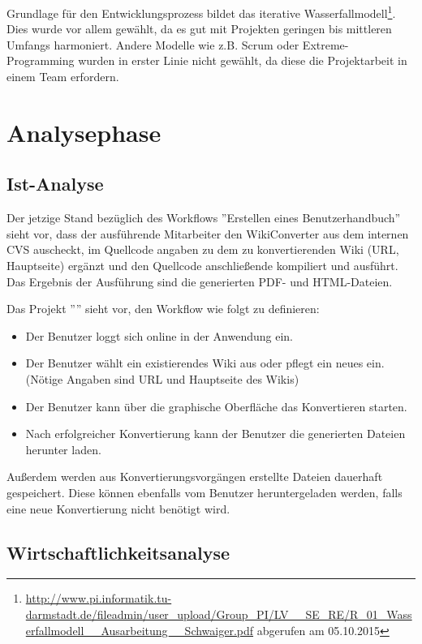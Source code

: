 \documentclass[12pt, xcolor=dvipsnames]{scrartcl}
\begin{document}
Grundlage für den Entwicklungsprozess bildet das iterative Wasserfallmodell\footnote{\url{http://www.pi.informatik.tu-darmstadt.de/fileadmin/user_upload/Group_PI/LV__SE_RE/R_01_Wasserfallmodell__Ausarbeitung__Schwaiger.pdf} abgerufen am 05.10.2015}.
Dies wurde vor allem gewählt, da es gut mit Projekten geringen bis mittleren Umfangs harmoniert. Andere Modelle wie z.B. Scrum oder Extreme-Programming wurden in erster Linie nicht gewählt, da diese die Projektarbeit in einem Team erfordern.

\section{Analysephase}

\subsection{Ist-Analyse}

Der jetzige Stand bezüglich des Workflows ''Erstellen eines Benutzerhandbuch'' sieht vor, dass der ausführende Mitarbeiter den WikiConverter aus dem internen CVS auscheckt, im Quellcode angaben zu dem zu konvertierenden Wiki (URL, Hauptseite) ergänzt und den Quellcode anschließende kompiliert und ausführt. Das Ergebnis der Ausführung sind die generierten PDF- und HTML-Dateien.

Das Projekt ''\Projekt'' sieht vor, den Workflow wie folgt zu definieren:
\begin{itemize}
	\item Der Benutzer loggt sich online in der Anwendung ein.
	\item Der Benutzer wählt ein existierendes Wiki aus oder pflegt ein neues ein. (Nötige Angaben sind URL und Hauptseite des Wikis)
	\item Der Benutzer kann über die graphische Oberfläche das Konvertieren starten.
	\item Nach erfolgreicher Konvertierung kann der Benutzer die generierten Dateien herunter laden.
\end{itemize}

Außerdem werden aus Konvertierungsvorgängen erstellte Dateien dauerhaft gespeichert. Diese können ebenfalls vom Benutzer heruntergeladen werden, falls eine neue Konvertierung nicht benötigt wird.

\subsection{Wirtschaftlichkeitsanalyse}
\label{sec:wirtschaftlichkeitsanalyse}
\end{document}
